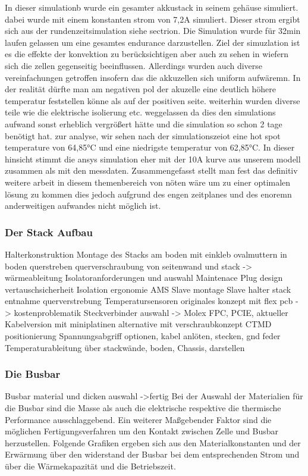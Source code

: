 In dieser simulationb wurde ein gesamter akkustack in seinem gehäuse simuliert. dabei wurde mit einem konstanten strom von 7,2A simuliert. Dieser strom ergibt sich aus der rundenzeitsimulation siehe sectrion. Die Simulation wurde für 32min laufen gelassen um eine gesamtes endurance darzustellen. Ziel der simuzlation ist es die effekte der konvektion zu berücksichtigen aber auch zu sehen in wiefern sich die zellen gegenseitig beeinflussen. Allerdings wurden auch diverse vereinfachungen getroffen insofern das die akkuzellen sich uniform aufwäremn. In der realität dürfte man am negativen pol der akuzelle eine deutlich höhere temperatur feststellen könne als auf der positiven seite. weiterhin wurden diverse teile wie die elektrische isolierung etc. weggelassen da dies den simulations aufwand sonst erheblich vergrößert hätte und die simulation so schon 2 tage benötigt hat. zur analyse, wir sehen nach der simulationszeiot eine hot spot temperature von 64,85°C und eine niedrigste temperatur von 62,85°C. In dieser hinsicht stimmt die ansys simulation eher mit der 10A kurve aus unserem modell zusammen als mit den messdaten. Zusammengefasst stellt man fest das definitiv weitere arbeit in diesem themenbereich von nöten wäre um zu einer optimalen lösung zu kommen dies jedoch aufgrund des engen zeitplanes und des enoremn anderweitigen aufwandes nicht möglich ist.
\FloatBarrier
\subsubsection{Der Stack Aufbau} %
Halterkonstruktion
	Montage des Stacks am boden mit einkleb ovalmuttern in boden querstreben
	querverschraubung von seitenwand und stack -> wärmeableitung
	Isolatoranforderungen und auswahl
Maintenace Plug design
	vertauschsicherheit
	Isolation
	ergonomie
AMS Slave montage
	Slave halter
	stack entnahme
	querverstrebung
Temperatursensoren
	originales konzept mit flex pcb -> kostenproblematik
	Steckverbinder auswahl -> Molex FPC, PCIE, aktueller
	Kabelversion mit miniplatinen
	alternative mit verschraubkonzept
CTMD
	positionierung
Spannungsabgriff
	optionen, kabel anlöten, stecken, gnd feder
Temperaturableitung
	über stackwände, boden, Chassis, darstellen
\FloatBarrier
\subsubsection{Die Busbar}
Busbar material und dicken auswahl
 ->fertig
 Bei der Auswahl der Materialien für die Busbar sind die Masse als auch die elektrische respektive die thermische Performance ausschlaggebend. Ein weiterer Maßgebender Faktor sind die möglichen Fertigungsverfahren um den Kontakt zwischen Zelle und Busbar herzustellen. Folgende Grafiken ergeben sich aus den Materialkonstanten und der Erwärmung über den widerstand der Busbar bei dem entsprechenden Strom und über die Wärmekapazität und die Betriebszeit.
 
